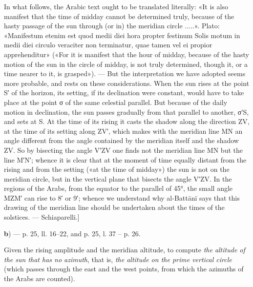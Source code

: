 \documentclass[11pt]{article}
\newcommand{\Pg}[1]{\marginpar{\footnotesize\color{gray}#1}}
\begin{document}
\par \Pg{I 186}In what follows, the Arabic text ought to be translated literally: «It is also manifest that the time of midday cannot be determined truly, because of the hasty passage of the sun through (or in) the meridian circle .....». Plato: «Manifestum etenim est quod medii diei hora propter festinum Solis motum in medii diei circulo veraciter non terminatur, quae tamen vel ei propior apprehenditur» («For it is manifest that the hour of midday, because of the hasty motion of the sun in the circle of midday, is not truly determined, though it, or a time nearer to it, is grasped»). — But the interpretation we have adopted seems more probable, and rests on these considerations. When the sun rises at the point S′ of the horizon, its setting, if its declination were constant, would have to take place at the point {\greekfont σ} of the same celestial parallel. But because of the daily motion in declination, the sun passes gradually from that parallel to another, {\greekfont σ}′S, and sets at S. At the time of its rising it casts the shadow along the direction ZV, at the time of its setting along ZV′, which makes with the meridian line MN an angle different from the angle contained by the meridian itself and the shadow ZV. So by bisecting the angle V′ZV one finds not the meridian line MN but the line M′N′; whence it is clear that at the moment of time equally distant from the rising and from the setting («at the time of midday») the sun is not on the meridian circle, but in the vertical plane that bisects the angle V′ZV. In the regions of the Arabs, from the equator to the parallel of 45°, the small angle MZM′ can rise to 8′ or 9′; whence we understand why al-Battānī says that this drawing of the meridian line should be undertaken about the times of the solstices. — Schiaparelli.]\par
\par\begin{center}\textbf{b}) — p. 25, ll. 16–22, and p. 25, l. 37 – p. 26.\end{center}
\par Given the rising amplitude and the meridian altitude, to compute \emph{the altitude of the sun that has no azimuth}, that is, \emph{the altitude on the prime vertical circle} (which passes through the east and the west points, from which the azimuths of the Arabs are counted).\par
\end{document}
